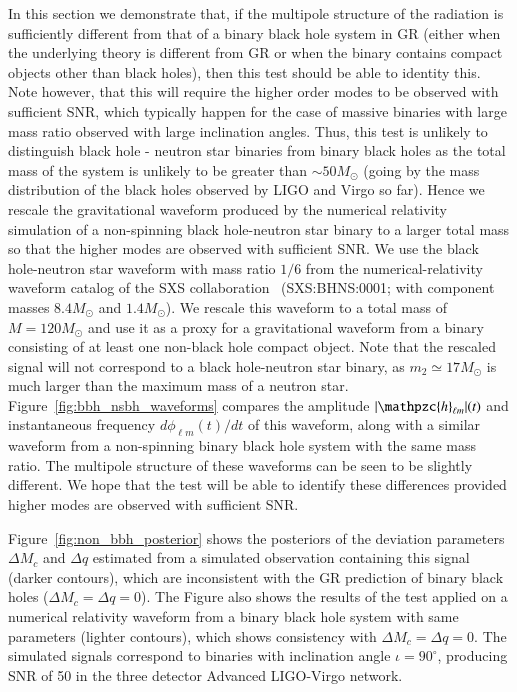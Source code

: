 \documentclass[prd,preprintnumbers,twocolumn,eqsecnum,floatfix,a4paper,nofootinbib,superscriptaddress]{revtex4}
\newcommand{\hlm}{\mathpzc{h}_{\ell m}}
\begin{document}
In this section we demonstrate that, if the multipole structure of the radiation is sufficiently different from that of a binary black hole system in GR (either when the underlying theory is different from GR or when the binary contains compact objects other than black holes), then this test should be able to identity this. Note however, that this will require the higher order modes to be observed with sufficient SNR, which typically happen for the case of massive binaries with large mass ratio observed with large inclination angles. Thus, this test is unlikely to distinguish black hole - neutron star binaries from binary black holes as the total mass of the system is unlikely to be greater than $\sim 50 M_\odot$ (going by the mass distribution of the black holes observed by LIGO and Virgo so far). Hence we rescale the gravitational waveform produced by the numerical relativity simulation of a non-spinning black hole-neutron star binary to a larger total mass so that the higher modes are observed with sufficient SNR. We use the  black hole-neutron star waveform with mass ratio ${1/6}$ from the numerical-relativity waveform catalog of the SXS collaboration~\cite{SXS-Catalog} (SXS:BHNS:0001; with component masses $8.4 M_\odot$ and $1.4 M_\odot$). We rescale this waveform to a total mass of $M = 120 M_\odot$ and use it as a proxy for a gravitational waveform from a binary consisting of at least one non-black hole compact object. Note that the rescaled signal will not correspond to a black hole-neutron star binary, as $m_2 \simeq 17 M_\odot$ is much larger than the maximum mass of a neutron star.  Figure~\ref{fig:bbh_nsbh_waveforms} compares the amplitude $|\hlm|(t)$ and instantaneous frequency $d\phi_{\ell m}(t)/dt$ of this waveform, along with a similar waveform from a non-spinning binary black hole system with the same mass ratio. The multipole structure of these waveforms can be seen to be slightly different. We hope that the test will be able to identify these differences provided higher modes are observed with sufficient SNR. 

Figure~\ref{fig:non_bbh_posterior} shows the posteriors of the deviation parameters $\Delta M_c$ and $\Delta q$ estimated from a simulated observation containing this signal (darker contours), which are {inconsistent} with the GR prediction of binary black holes ($\Delta M_c = \Delta q = 0$). The Figure also shows the results of the test applied on a numerical relativity waveform from a binary black hole system with same parameters (lighter contours), which shows consistency with $\Delta M_c = \Delta q = 0$. The simulated signals correspond to binaries with inclination angle $\iota = 90^\circ$, producing SNR of 50 in the three detector Advanced LIGO-Virgo network. 
\end{document}

